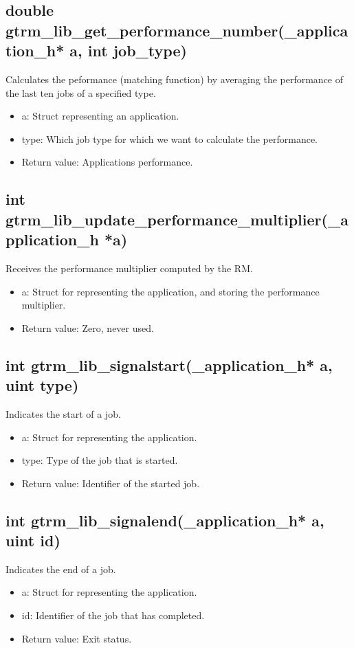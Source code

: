 \documentclass[nobiblatex]{LTHthesis}
\begin{document}
\subsection{double gtrm\_lib\_get\_performance\_number(\_application\_h* a, int job\_type)}
Calculates the peformance (matching function) by averaging the performance of the last ten jobs of a specified type.
\begin{itemize}
\item a: Struct representing an application.
\item type: Which job type for which we want to calculate the performance.
\item Return value: Applications performance.
\end{itemize}

\subsection{int gtrm\_lib\_update\_performance\_multiplier(\_application\_h *a)}
Receives the performance multiplier computed by the RM.
\begin{itemize}
\item a: Struct for representing the application, and storing the performance multiplier.
\item Return value: Zero, never used.
\end{itemize}

\subsection{int gtrm\_lib\_signalstart(\_application\_h* a, uint type)}
Indicates the start of a job.
\begin{itemize}
\item a: Struct for representing the application.
\item type: Type of the job that is started.
\item Return value: Identifier of the started job.
\end{itemize}

\subsection{int gtrm\_lib\_signalend(\_application\_h* a, uint id)}
Indicates the end of a job.
\begin{itemize}
\item a: Struct for representing the application.
\item id: Identifier of the job that has completed.
\item Return value: Exit status.
\end{itemize}
\end{document}
